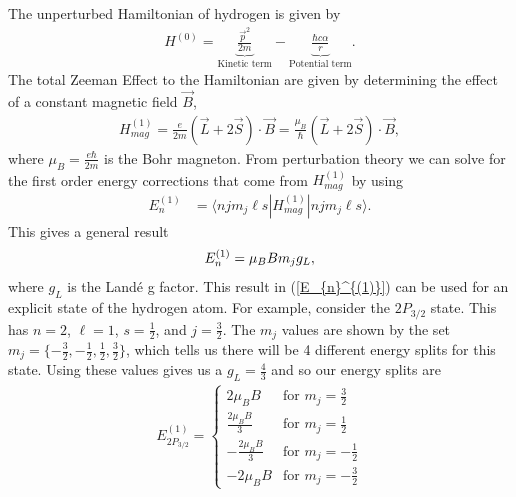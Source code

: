 \documentclass[landscape,a0paper,fontscale=0.285]{baposter} %
\begin{document}
\begin{poster}
{\begin{multicols}{2}
	The unperturbed Hamiltonian of hydrogen is given by 
	\begin{align}
	H^{(0)} = \underbrace{\frac{\vec{p}^2}{2m}}_{\textrm{Kinetic term}}-\underbrace{\frac{\hbar c \alpha}{r}}_{\textrm{Potential term}}.
	\end{align}
	The total Zeeman Effect to the Hamiltonian are given by determining the effect of a constant magnetic field $\vec{B}$,
	\begin{align}
	H_{mag}^{(1)}= \frac{e}{2m}(\vec{L}+2\vec{S})\cdot \vec{B} = \frac{\mu_B}{\hbar}(\vec{L}+2\vec{S})\cdot \vec{B},
	\end{align} 
	where $\mu_B=\frac{e\hbar}{2m}$ is the Bohr magneton. From perturbation theory we can solve for the first order energy corrections that come from $H_{mag}^{(1)}$ by using 
	\begin{align}
	E_{n}^{(1)} &= \langle n j m_j \ell s| H_{mag}^{(1)}|n j m_j \ell s \rangle.
	\end{align}
	This gives a general result 
	\begin{align}
	E_{n}^{(1)}  = \mu_BBm_jg_L, \label{E_{n}^{(1)}}
	\end{align}
	where $g_L$ is the Land\'{e} g factor. This result in (\ref{E_{n}^{(1)}}) can be used for an explicit state of the hydrogen atom. For example, consider the $2P_{3/2}$ state. This has $n=2$, $\ell =1$, $s=\frac{1}{2}$, and $j=\frac{3}{2}$. The $m_j$ values are shown by the set $m_j = \{-\frac{3}{2},-\frac{1}{2}, \frac{1}{2}, \frac{3}{2} \}$, which tells us there will be 4 different energy splits for this state. Using these values gives us a $g_L=\frac{4}{3}$ and so our energy splits are
	\begin{align}
	E_{2P_{3/2}}^{(1)} = \begin{cases}
	2\mu_BB & \textrm{for }m_j = \frac{3}{2}\\ 
	\frac{2\mu_BB}{3} & \textrm{for }m_j = \frac{1}{2} \\
	-\frac{2\mu_BB}{3}& \textrm{for }m_j = -\frac{1}{2} \\
	-2\mu_BB & \textrm{for }m_j = -\frac{3}{2}
	\end{cases}  \label{l=1 energies}
	\end{align}
\end{multicols}
\vspace{0.01cm}
}



\end{poster}
\end{document}
